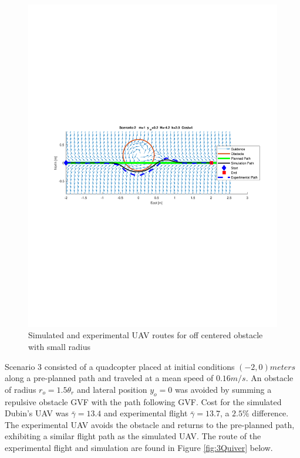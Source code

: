 \documentclass[numbered,pdftex]{ohio-etd}
\begin{document}
\begin{figure}[H]
	\centering
	\includegraphics[trim = 50 300 0 285, clip, width=16.5cm]{Figures/results/compareFigures/2Quiver}
	\caption{Simulated and experimental UAV routes for off centered obstacle with small radius}
	\label{fig:2Quiver}
	\end{figure}

Scenario 3 consisted of a quadcopter placed at initial conditions $(-2,0) meters$ along a pre-planned path and traveled at a mean speed of $0.16 m/s$. An obstacle of radius $r_o = 1.5 \theta_r$ and lateral position $y_o=0$ was avoided by summing a repulsive obstacle GVF with the path following GVF. Cost for the simulated Dubin's UAV was $\bar{\gamma} = 13.4$ and experimental flight $\bar{\gamma} = 13.7$, a $2.5 \%$ difference. The experimental UAV avoids the obstacle and returns to the pre-planned path, exhibiting a similar flight path as the simulated UAV. The route of the experimental flight and simulation are found in Figure \ref{fig:3Quiver} below. 
\end{document}

